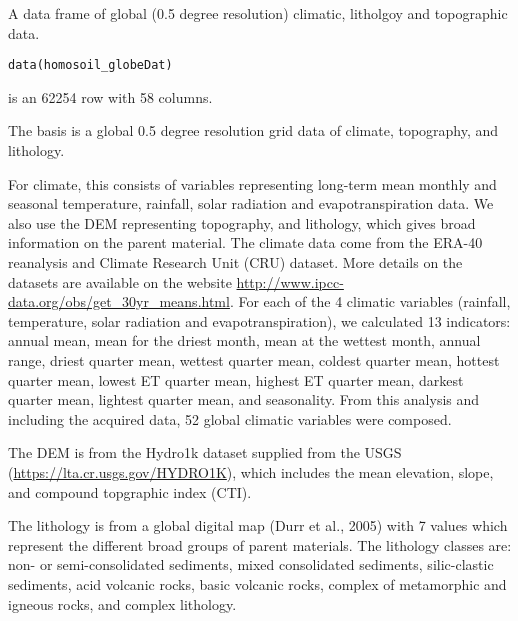\documentclass[a4paper]{book}
\begin{document}
%
\begin{Description}
A data frame of global (0.5 degree resolution) climatic, litholgoy and topographic data.
\end{Description}
%
\begin{Usage}
\begin{verbatim}
data(homosoil_globeDat)
\end{verbatim}
\end{Usage}
%
\begin{Format}
 is an 62254 row  with 58 columns.  
\end{Format}
%
\begin{Details}
The basis is a global 0.5 degree resolution grid data of climate, topography, and lithology.

For climate, this consists of variables representing long-term mean monthly and seasonal temperature, rainfall, solar radiation and evapotranspiration data. We also use the DEM representing topography, and lithology, which gives broad information on the parent material. The climate data come from the ERA-40 reanalysis and Climate Research Unit (CRU) dataset. More details on the datasets are available on the website \url{http://www.ipcc-data.org/obs/get_30yr_means.html}. For each of the 4 climatic variables (rainfall, temperature, solar radiation and evapotranspiration), we calculated 13 indicators: annual mean, mean for the driest month, mean at the wettest month, annual range, driest quarter mean, wettest quarter mean, coldest quarter mean, hottest quarter mean, lowest ET quarter mean, highest ET quarter mean, darkest quarter mean, lightest quarter mean, and seasonality. From this analysis and including the acquired data, 52 global climatic variables were composed.

The DEM is from the Hydro1k dataset supplied from the USGS (\url{https://lta.cr.usgs.gov/HYDRO1K}), which includes the mean elevation, slope, and compound topgraphic index (CTI).

The lithology is from a global digital map (Durr et al., 2005)  with 7 values which represent the different broad groups of parent materials. The lithology classes are: non- or semi-consolidated sediments, mixed consolidated sediments, silic-clastic sediments, acid volcanic rocks, basic volcanic rocks, complex of metamorphic and igneous rocks, and complex lithology.
\end{Details}
\end{document}
